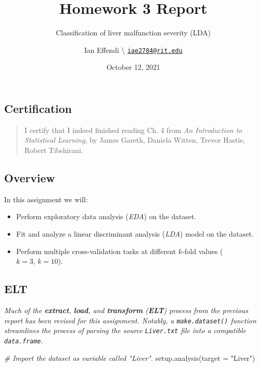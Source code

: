 \documentclass[
  11pt,
  a4paper,
]{scrartcl}
\title{Homework 3 Report}
\subtitle{Classification of liver malfunction severity (LDA)}
\author{Ian Effendi \textbackslash{}
\href{mailto:iae2784@rit.edu}{\nolinkurl{iae2784@rit.edu}}}
\date{October 12, 2021}
\newenvironment{Shaded}{\begin{snugshade}}{\end{snugshade}}
\newcommand{\AttributeTok}[1]{\textcolor[rgb]{0.77,0.63,0.00}{#1}}
\newcommand{\CommentTok}[1]{\textcolor[rgb]{0.56,0.35,0.01}{\textit{#1}}}
\newcommand{\FunctionTok}[1]{\textcolor[rgb]{0.00,0.00,0.00}{#1}}
\newcommand{\NormalTok}[1]{#1}
\newcommand{\StringTok}[1]{\textcolor[rgb]{0.31,0.60,0.02}{#1}}
\providecommand{\tightlist}{%
  \setlength{\itemsep}{0pt}\setlength{\parskip}{0pt}}
\begin{document}
\maketitle

{
\hypersetup{linkcolor=blue}
\setcounter{tocdepth}{3}
\tableofcontents
}
\hypertarget{certification}{%
\subsection{Certification}\label{certification}}

\begin{quote}
I certify that I indeed finished reading Ch. 4 from \emph{An
Introduction to Statistical Learning}, by James Gareth, Daniela Witten,
Trevor Hastie, Robert Tibshirani.
\end{quote}

\hypertarget{overview}{%
\subsection{Overview}\label{overview}}

In this assignment we will:

\begin{itemize}
\tightlist
\item
  Perform exploratory data analysis (\emph{EDA}) on the dataset.
\item
  Fit and analyze a linear discriminant analysis (\emph{LDA}) model on
  the dataset.
\item
  Perform multiple cross-validation tasks at different \(k\)-fold values
  (\(k=3,\,k=10\)).
\end{itemize}

\hypertarget{elt}{%
\subsection{ELT}\label{elt}}

\emph{Much of the \textbf{extract}, \textbf{load}, and
\textbf{transform} (\textbf{ELT}) process from the previous report has
been revised for this assignment. Notably, a \texttt{make.dataset()}
function streamlines the process of parsing the source
\texttt{Liver.txt} file into a compatible \texttt{data.frame}.}

\begin{Shaded}
\begin{Highlighting}[]
\CommentTok{\# Import the dataset as variable called "Liver".}
\FunctionTok{setup.analysis}\NormalTok{(}\AttributeTok{target =} \StringTok{"Liver"}\NormalTok{)}
\end{Highlighting}
\end{Shaded}
\end{document}
